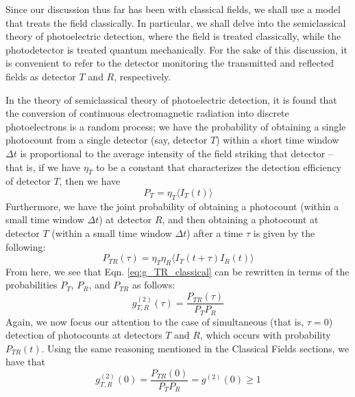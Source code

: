 \documentclass[twocolumn,amsmath,amssymb,pra]{revtex4-2}
\begin{document}
Since our discussion thus far has been with classical fields, we shall use a model that treats the field classically. In particular, we shall delve into the semiclassical theory of photoelectric detection, where the field is treated classically, while the photodetector is treated quantum mechanically. For the sake of this discussion, it is convenient to refer to the detector monitoring the transmitted and reflected fields as detector $T$ and $R$, respectively. 

In the theory of semiclassical theory of photoelectric detection, it is found that the conversion of continuous electromagnetic radiation into discrete photoelectrons is a random process; we have the probability of obtaining a single photocount from a single detector (say, detector $T$) within a short time window $\Delta t$ is proportional to the average intensity of the field striking that detector -- that is, if we have $\eta_{T}$ to be a constant that characterizes the detection efficiency of detector $T$, then we have 
\begin{equation}
    P_{T}
    =
    \eta_{T} \langle I_{T}(t) \rangle
    \label{eq:P_T}
\end{equation}
Furthermore, we have the joint probability of obtaining a photocount (within a small time window $\Delta t$) at detector $R$, and then obtaining a photocount at detector $T$ (within a small time window $\Delta t$) after a time $\tau$ is given by the following: 
\begin{equation}
    P_{TR} (\tau)
    =
    \eta_{T} \eta_{R} 
    \langle I_{T}(t + \tau) I_{R}(t) \rangle
    \label{eq:P_TR}
\end{equation}
From here, we see that Eqn. \ref{eq:g_TR_classical} can be rewritten in terms of the probabilities $P_{T}$, $P_{R}$, and $P_{TR}$ as follows: 
\begin{equation}
    g_{T, R}^{( 2 )} (\tau)
    =
    \frac{ P_{TR}(\tau) }{ P_{T} P_{R} }
\end{equation}
Again, we now focus our attention to the case of simultaneous (that is, $\tau = 0$) detection of photocounts at detectors $T$ and $R$, which occurs with probability $P_{TR}(t)$. Using the same reasoning mentioned in the Classical Fields sections, we have that 
\begin{equation}
    g_{T, R}^{( 2 )} (0)
    =
    \frac{ P_{TR}(0) }{ P_{T} P_{R} }
    =
    g^{( 2 )} (0) 
    \geq 1
    \label{eq:ineq_semiclassical}
\end{equation}
\end{document}
